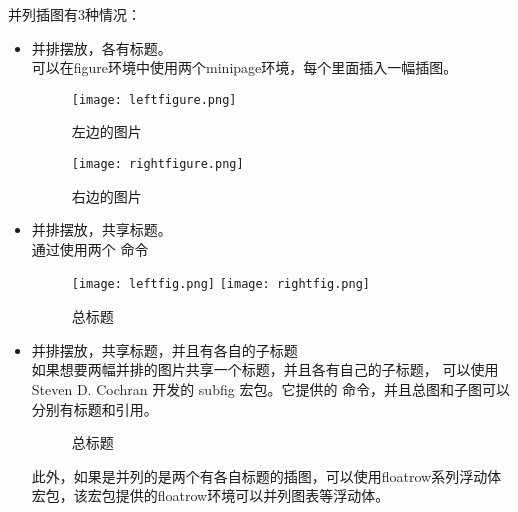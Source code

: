 
并列插图有3种情况：

\begin{itemize}
    \item 并排摆放，各有标题。\\
    可以在figure环境中使用两个minipage环境，每个里面插入一幅插图。
    
    \begin{texinlist}
    \begin{figure}[htbp]
    \centering
    \begin{minipage}{60pt}
    \centering \texttt{[image: leftfigure.png]} \caption{左边的图片}
    \end{minipage}
    \hspace{10pt}%
    \begin{minipage}{60pt}
    \centering
    \texttt{[image: rightfigure.png]} \caption{右边的图片}
    \end{minipage}
    \end{figure}
    \end{texinlist}
    \item 并排摆放，共享标题。\\
    通过使用两个  命令

   \begin{texinlist}
\begin{figure}[htbp]
\centering
\texttt{[image: leftfig.png]}
\texttt{[image: rightfig.png]}
\caption{总标题}
\end{figure}
    \end{texinlist}
    
    \item 并排摆放，共享标题，并且有各自的子标题 \\
    如果想要两幅并排的图片共享一个标题，并且各有自己的子标题， 可以使用Steven D. Cochran 开发的 subfig 宏包。它提供的  命令，并且总图和子图可以分别有标题和引用。
    
    \begin{texinlist}
\begin{figure}[htbp]
  \centering
  \hspace{10pt}%
  \caption{总标题}
  \label{fig:subfig}
\end{figure}
    \end{texinlist}

    此外，如果是并列的是两个有各自标题的插图，可以使用floatrow系列浮动体宏包，该宏包提供的floatrow环境可以并列图表等浮动体。
    
\end{itemize}


